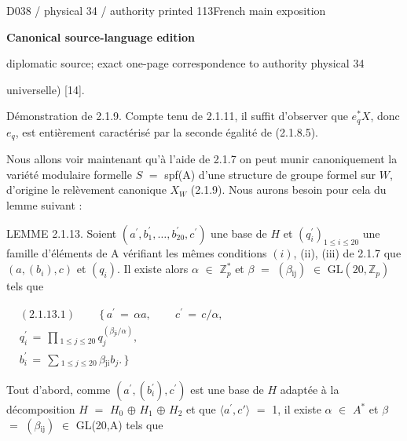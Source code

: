 \documentclass[9pt]{article}
\newcommand{\CanonText}[1]{\par{\fontsize{8.0}{9.35}\selectfont\RaggedRight #1\par}\vspace{2.2pt}}
\newenvironment{CanonMathBlock}{\par\vspace{1.2pt}\begin{center}\fontsize{6.8}{8.0}\selectfont\(\displaystyle}{\)\end{center}\vspace{1.2pt}}
\newcommand{\LayerTitle}{Canonical source-language edition}
\begin{document}
\noindent\begin{minipage}[t][\dimexpr\textheight-5pt\relax][t]{\textwidth}
{\sffamily\fontsize{7.3}{8.2}\selectfont\color{Quiet} D038 / physical 34 / authority printed 113\hfill French main exposition}
\par{}\vspace{4.5pt}
{\sffamily\fontsize{10.4}{11.6}\selectfont\bfseries\color{Accent} \LayerTitle}
\par{\sffamily\fontsize{6.7}{7.7}\selectfont\color{Quiet} diplomatic source; exact one-page correspondence to authority physical 34}
\vspace{5pt}
\CanonText{universelle) [14].}
\CanonText{Démonstration de 2.1.9. Compte tenu de 2.1.11, il suffit d'observer que \(e_{q}^{*}X\), donc \(e_{q}\), est entièrement caractérisé par la seconde égalité de (2.1.8.5).}
\CanonText{Nous allons voir maintenant qu'à l'aide de 2.1.7 on peut munir canoniquement la variété modulaire formelle \(S\) \(=\) spf(A) d'une structure de groupe formel sur \(W\), d'origine le relèvement canonique \(X_{W}\) (2.1.9). Nous aurons besoin pour cela du lemme suivant :}
\CanonText{LEMME 2.1.13. Soient \((a^{\prime},b^{\prime}_{1},\ldots{},b^{\prime}_{20},c^{\prime})\) une base de \(H\) et \((q^{\prime}_{i})_{1\leq{}i\leq{}20}\) une famille d'éléments de A vérifiant les mêmes conditions \((i)\), (ii), (iii) de 2.1.7 que \((a,(b_{i}),c)\) et \((q_{i})\). Il existe alors \(\alpha{}\) \(\in{}\) \(\mathbb{Z}_{p}^{*}\) et \(\beta{}\) \(=\) \((\beta{}_{\mathrm{ij}})\) \(\in{}\) \(\mathrm{GL}(20,\mathbb{Z}_{p})\) tels que}
\begin{CanonMathBlock}
\begin{aligned}
& (2.1.13.1)\qquad\,\lbrace{}\,a^{\prime}\,=\,\alpha{}a,\qquad\,c^{\prime}\,=\,c/\alpha{},\\
& q^{\prime}_{i}\,=\,\prod{}_{1\leq{}j\leq{}20}\,q_{j}^{(\beta{}_{\mathrm{ji}}/\alpha{})},\\
& b^{\prime}_{i}\,=\,\sum{}_{1\leq{}j\leq{}20}\,\beta{}_{\mathrm{ji}}b_{j}.\,\rbrace{}
\end{aligned}
\end{CanonMathBlock}
\CanonText{Tout d'abord, comme \((a^{\prime},(b^{\prime}_{i}),c^{\prime})\) est une base de \(H\) adaptée à la décomposition \(H\) \(=\) \(H_{0}\) \(\oplus{}\) \(H_{1}\) \(\oplus{}\) \(H_{2}\) et que \(\langle{}a^{\prime},c'\rangle{}\) \(=\) 1, il existe \(\alpha{}\) \(\in{}\) \(A^{*}\) et \(\beta{}\) \(=\) \((\beta{}_{\mathrm{ij}})\) \(\in{}\) GL(20,A) tels que}

\end{minipage}
\end{document}
